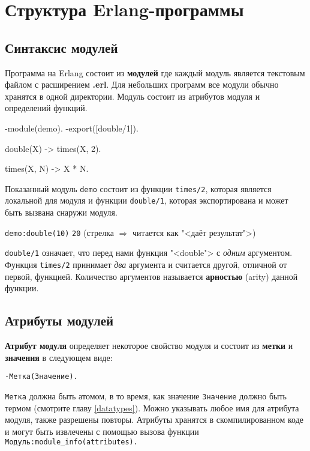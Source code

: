 \chapter{Структура Erlang-программы}

\section{Синтаксис модулей}

Программа на Erlang состоит из \textbf{модулей} где каждый модуль является 
текстовым файлом с расширением \textbf{.erl}. Для небольших программ все
модули обычно хранятся в одной директории. Модуль состоит из атрибутов модуля
и определений функций.

\begin{erlang}
-module(demo).
-export([double/1]).

double(X) -> times(X, 2).

times(X, N) -> X * N.
\end{erlang}

Показанный модуль \texttt{demo} состоит из функции \texttt{times/2}, которая
является локальной для модуля и функции \texttt{double/1}, которая
экспортирована и может быть вызвана снаружи модуля.

\texttt{demo:double(10)} \resultingin \texttt{20}\hfill
(стрелка $\Rightarrow$ читается как "<даёт результат">)

\texttt{double/1} означает, что перед нами функция "<double"> с \emph{одним}
аргументом. Функция \texttt{times/2} принимает \emph{два} аргумента и считается
другой,  отличной от первой, функцией. Количество аргументов называется
\textbf{арностью} (arity) данной функции.



\section{Атрибуты модулей}

\textbf{Атрибут модуля} определяет некоторое свойство модуля и состоит из 
\textbf{метки} и \textbf{значения} в следующем виде:

\texttt{-Метка(Значение).}

\texttt{Метка} должна быть атомом, в то время, как значение \texttt{Значение} 
должно быть термом (смотрите главу \ref{datatypes}). Можно указывать любое имя
для атрибута модуля, также разрешены повторы. Атрибуты хранятся в скомпилированном
коде и могут быть извлечены с помощью вызова функции
\texttt{Модуль:module\_info(attributes).}

